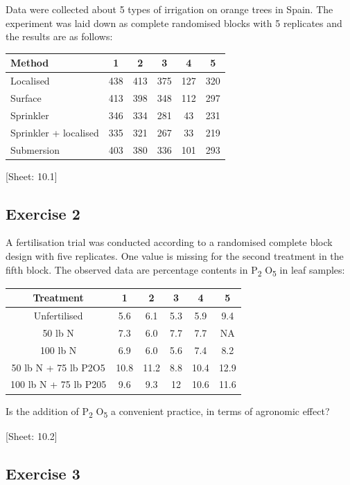 \documentclass[a4paper,12pt,oneside]{book}
\begin{document}
Data were collected about 5 types of irrigation on orange trees in Spain. The experiment was laid down as complete randomised blocks with 5 replicates and the results are as follows:

\begin{longtable}[]{@{}lccccc@{}}
\toprule()
Method & 1 & 2 & 3 & 4 & 5 \\
\midrule()
\endhead
Localised & 438 & 413 & 375 & 127 & 320 \\
Surface & 413 & 398 & 348 & 112 & 297 \\
Sprinkler & 346 & 334 & 281 & 43 & 231 \\
Sprinkler + localised & 335 & 321 & 267 & 33 & 219 \\
Submersion & 403 & 380 & 336 & 101 & 293 \\
\bottomrule()
\end{longtable}

{[}Sheet: 10.1{]}

\hypertarget{exercise-2-6}{%
\subsection{Exercise 2}\label{exercise-2-6}}

A fertilisation trial was conducted according to a randomised complete block design with five replicates. One value is missing for the second treatment in the fifth block. The observed data are percentage contents in P\textsubscript{2} O\textsubscript{5} in leaf samples:

\begin{longtable}[]{@{}cccccc@{}}
\toprule()
Treatment & 1 & 2 & 3 & 4 & 5 \\
\midrule()
\endhead
Unfertilised & 5.6 & 6.1 & 5.3 & 5.9 & 9.4 \\
50 lb N & 7.3 & 6.0 & 7.7 & 7.7 & NA \\
100 lb N & 6.9 & 6.0 & 5.6 & 7.4 & 8.2 \\
50 lb N + 75 lb P2O5 & 10.8 & 11.2 & 8.8 & 10.4 & 12.9 \\
100 lb N + 75 lb P205 & 9.6 & 9.3 & 12 & 10.6 & 11.6 \\
\bottomrule()
\end{longtable}

Is the addition of P\textsubscript{2} O\textsubscript{5} a convenient practice, in terms of agronomic effect?

{[}Sheet: 10.2{]}

\hypertarget{exercise-3-6}{%
\subsection{Exercise 3}\label{exercise-3-6}}
\end{document}
